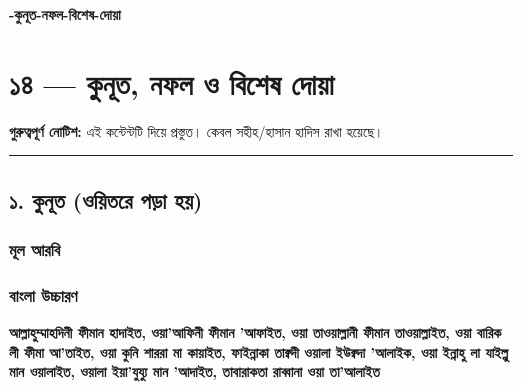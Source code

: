 

\begin{center}{\Large\bfseries\color{emerald} -কুনূত-নফল-বিশেষ-দোয়া}\end{center}
\vspace{1em}
\section*{১৪ — কুনূত, নফল ও বিশেষ দোয়া}

\begin{warnbox}
 \textbf{গুরুত্বপূর্ণ নোটিশ:} এই কন্টেন্টটি  দিয়ে প্রস্তুত। কেবল সহীহ/হাসান হাদিস রাখা হয়েছে।
\end{warnbox}

\medskip\hrule\medskip

\subsection*{১. কুনূত (ওয়িতরে পড়া হয়)}

\subsubsection*{মূল আরবি}
\begin{center}\end{center}

\subsubsection*{বাংলা উচ্চারণ}
\textbf{আল্লাহুম্মাহদিনী ফীমান হাদাইত, ওয়া'আফিনী ফীমান 'আফাইত, ওয়া তাওয়াল্লানী ফীমান তাওয়াল্লাইত, ওয়া বারিক লী ফীমা আ'তাইত, ওয়া কুনি শাররা মা কায়াইত, ফাইন্নাকা তাক্বদী ওয়ালা ইউক্বদা 'আলাইক, ওয়া ইন্নাহু লা যাইল্লু মান ওয়ালাইত, ওয়ালা ইয়া'যুয্যু মান 'আদাইত, তাবারাকতা রাব্বানা ওয়া তা'আলাইত}

